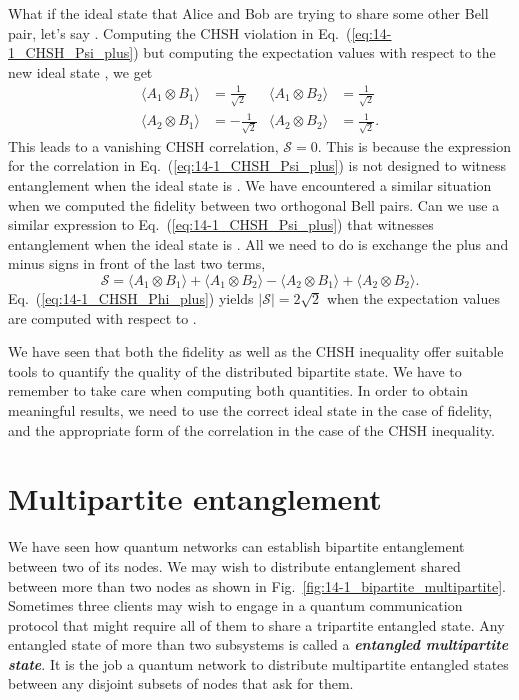 What if the ideal state that Alice and Bob are trying to share some other Bell pair, let's say \ket{\Phi^+}.
Computing the CHSH violation in Eq.~(\ref{eq:14-1_CHSH_Psi_plus}) but computing the expectation values with respect to the new ideal state \ket{\Phi^+}, we get
\begin{align}
    \langle A_1 \otimes B_1 \rangle & = \frac{1}{\sqrt{2}} & \langle A_1 \otimes B_2 \rangle & = \frac{1}{\sqrt{2}} \\
    \langle A_2 \otimes B_1 \rangle & = - \frac{1}{\sqrt{2}} & \langle A_2 \otimes B_2 \rangle & = \frac{1}{\sqrt{2}}.
\end{align}
This leads to a vanishing CHSH correlation, $\mathcal{S} = 0$.
This is because the expression for the correlation in Eq.~(\ref{eq:14-1_CHSH_Psi_plus}) is not designed to witness entanglement when the ideal state is \ket{\Phi^+}.
We have encountered a similar situation when we computed the fidelity between two orthogonal Bell pairs.
Can we use a similar expression to Eq.~(\ref{eq:14-1_CHSH_Psi_plus}) that witnesses entanglement when the ideal state is \ket{\Phi^+}.
All we need to do is exchange the plus and minus signs in front of the last two terms,
\begin{equation}
    \mathcal{S} = \langle A_1 \otimes B_1\rangle + \langle A_1 \otimes B_2\rangle - \langle A_2 \otimes B_1\rangle + \langle A_2 \otimes B_2\rangle.
    \label{eq:14-1_CHSH_Phi_plus}
\end{equation}
Eq.~(\ref{eq:14-1_CHSH_Phi_plus}) yields $|\mathcal{S}| = 2\sqrt{2}$ when the expectation values are computed with respect to \ket{\Phi^+}.

We have seen that both the fidelity as well as the CHSH inequality offer suitable tools to quantify the quality of the distributed bipartite state.
We have to remember to take care when computing both quantities.
In order to obtain meaningful results, we need to use the correct ideal state in the case of fidelity, and the appropriate form of the correlation in the case of the CHSH inequality.




\section{Multipartite entanglement}
\label{sec:14-2_multipartite}

We have seen how quantum networks can establish bipartite entanglement between two of its nodes.
We may wish to distribute entanglement shared between more than two nodes as shown in Fig.~\ref{fig:14-1_bipartite_multipartite}.
Sometimes three clients may wish to engage in a quantum communication protocol that might require all of them to share a tripartite entangled state.
Any entangled state of more than two subsystems is called a \textit{\textbf{entangled multipartite state}}.
It is the job a quantum network to distribute multipartite entangled states between any disjoint subsets of nodes that ask for them.


